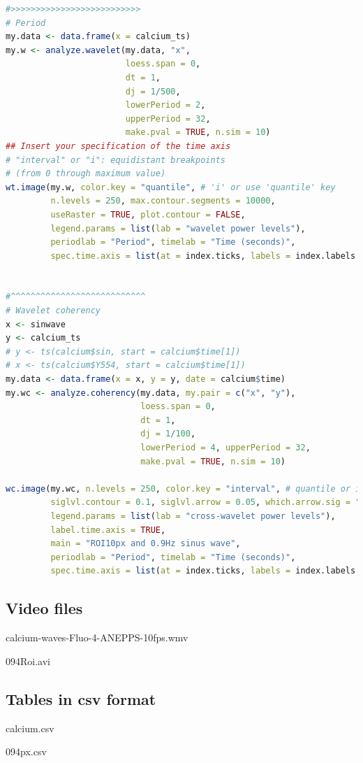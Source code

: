 \documentclass{biophys-new}
\begin{document}
\begin{lstlisting}[language=R]
#>>>>>>>>>>>>>>>>>>>>>>>>>>
# Period
my.data <- data.frame(x = calcium_ts)
my.w <- analyze.wavelet(my.data, "x",
                        loess.span = 0,
                        dt = 1,
                        dj = 1/500,
                        lowerPeriod = 2,
                        upperPeriod = 32,
                        make.pval = TRUE, n.sim = 10)
## Insert your specification of the time axis
# "interval" or "i": equidistant breakpoints
# (from 0 through maximum value)
wt.image(my.w, color.key = "quantile", # 'i' or use 'quantile' key
         n.levels = 250, max.contour.segments = 10000,
         useRaster = TRUE, plot.contour = FALSE,
         legend.params = list(lab = "wavelet power levels"),
         periodlab = "Period", timelab = "Time (seconds)",
         spec.time.axis = list(at = index.ticks, labels = index.labels.rounded))


#^^^^^^^^^^^^^^^^^^^^^^^^^^^
# Wavelet coherency
x <- sinwave
y <- calcium_ts
# y <- ts(calcium$sin, start = calcium$time[1])
# x <- ts(calcium$Y554, start = calcium$time[1])
my.data <- data.frame(x = x, y = y, date = calcium$time)
my.wc <- analyze.coherency(my.data, my.pair = c("x", "y"),
                           loess.span = 0,
                           dt = 1,
                           dj = 1/100,
                           lowerPeriod = 4, upperPeriod = 32,
                           make.pval = TRUE, n.sim = 10)

wc.image(my.wc, n.levels = 250, color.key = "interval", # quantile or interval
         siglvl.contour = 0.1, siglvl.arrow = 0.05, which.arrow.sig = "wt",
         legend.params = list(lab = "cross-wavelet power levels"),
         label.time.axis = TRUE,
         main = "ROI10px and 0.9Hz sinus wave",
         periodlab = "Period", timelab = "Time (seconds)",
         spec.time.axis = list(at = index.ticks, labels = index.labels.rounded))

\end{lstlisting}

\subsection*{Video files}

calcium-waves-Fluo-4-ANEPPS-10fps.wmv

094Roi.avi

\subsection*{Tables in csv format}

calcium.csv

094px.csv

\end{document}
